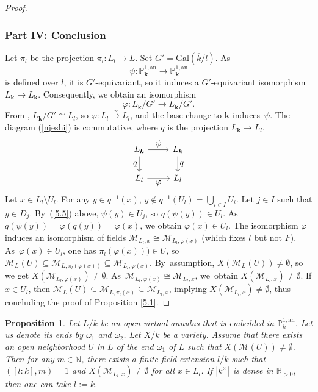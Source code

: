 \documentclass[JEP,XML,SOM,Unicode,NoFloatCountersInSection,published]{cedram}
\newcommand{\bbk}{{\boldsymbol{k}}}%
\let\backslash\setminus
\let\ts\textstyle
\newtheorem{prop}[thm]{Proposition}
\theoremstyle{definition}
\begin{document}
\begin{proof}
\subsubsection*{Part IV: Conclusion}
Let $\pi_l$ be the projection $\pi_l: L_l \to L$. Set $G'=\mathrm{Gal}(\overline{k}/l)$. As
\[
\psi: \mathbb{P}^{1, \mathrm{an}}_{\bbk} \to \mathbb{P}^{1, \mathrm{an}}_{\bbk}
\]
is defined over $l$, it is $G'$-equivariant, so it induces a $G'$-equivariant isomorphism $L_{\bbk} \to L_{\bbk}$. Consequently, we obtain an isomorphism
\[
\varphi: L_{\bbk}/G' \to L_{\bbk}/G'.
\]
From \cite[Cor.\,1.3.6]{Ber90}, $L_{\bbk}/G' \cong L_l$, so $\varphi: L_l \xrightarrow{\sim} L_l$, and the base change to $\bbk$ induces~$\psi$. The diagram (\ref{njeshi}) is commutative, where $q$ is the projection $L_{\bbk} \to L_l$.
\begin{equation} \label{njeshi}
\begin{tikzcd}
L_{\bbk} \arrow{r}{\ts\psi} \arrow{d}[swap]{\ts q}& L_{\bbk} \arrow{d}{\ts q} \\
L_l \arrow{r}[swap]{\ts\varphi} & L_l
\end{tikzcd}
\end{equation}
Let $x \in L_l \backslash U_l$. For any $y \in q^{-1}(x)$, $y \not \in q^{-1}(U_l)=\bigcup_{i \in I} U_i$. Let $j \in I$ such that $y \in D_j$. By~(\ref{5.5}) above, $\psi(y) \in U_j$, so $q(\psi(y)) \in U_l$. As~$q(\psi(y))=\varphi(q(y))=\varphi(x)$, we obtain $\varphi(x) \in U_l$. The isomorphism $\varphi$ induces an isomorphism of fields $\mathscr{M}_{L_l, x} \cong \mathscr{M}_{L_l, \varphi(x)}$ (which fixes $l$ but not $F$). As~$\varphi(x) \in U_l$, one has $\pi_l(\varphi(x))) \in U$, so $\mathscr{M}_L(U) \subseteq \mathscr{M}_{L, \pi_l(\varphi(x))} \subseteq \mathscr{M}_{L_l, \varphi(x)}$. By~assumption, $X(\mathscr{M}_L(U)) \neq \emptyset$, so we get $X(\mathscr{M}_{L_l, \varphi(x)}) \neq \emptyset$. As~$\mathscr{M}_{L_l, \varphi(x)} \cong \mathscr{M}_{L_l,x}$, we~obtain $X(\mathscr{M}_{L_l, x}) \neq \emptyset$.
If $x \in U_l$, then $\mathscr{M}_{L}(U) \subseteq \mathscr{M}_{L, \pi_l(x)} \subseteq \mathscr{M}_{L_l, x}$, implying $X(\mathscr{M}_{L_l, x}) \neq \emptyset$, thus concluding the proof of Proposition \ref{5.1}.
\end{proof}

\begin{prop} \label{5.5.1}
Let $L/k$ be an open virtual annulus that is embedded in $\mathbb{P}_k^{1, \mathrm{an}}$. Let us denote its ends by $\omega_1$ and $\omega_2$. Let $X/k$ be a variety. Assume that there exists an open neighborhood $U$ in $L$ of the end $\omega_1$ of $L$ such that $X(\mathscr{M}(U)) \neq \emptyset$. Then for any $m \in \mathbb{N}$, there exists a finite field extension $l/k$ such that $([l:k], m)=1$ and $X(\mathscr{M}_{L_l, x}) \neq \emptyset$ for all $x \in L_l$.
If $|k^{\times}|$ is dense in $\mathbb{R}_{>0}$, then one can take $l:=k$.
\end{prop}
\end{document}
